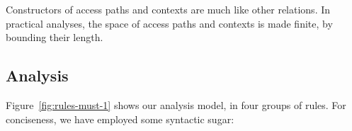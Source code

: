 Constructors of access paths and contexts are much like other relations. In
practical analyses, the space of access paths and contexts is made finite,
by bounding their length. %




\subsection{Analysis}

Figure~\ref{fig:rules-must-1} 
shows our analysis model, in four groups of rules. For conciseness, we have
employed some syntactic sugar:

